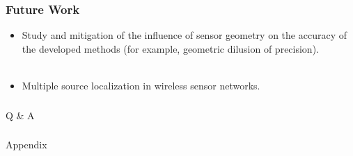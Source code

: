 \documentclass [t] {beamer} %
\begin{document}
\begin{frame} %
\frametitle{Future Work}
\phantom{m}
\phantom{m}
\phantom{m}
\begin{itemize}
\item
Study and mitigation of the influence of sensor geometry on the accuracy of the developed methods (for example, geometric dilusion of precision).
\\~\\
\item
Multiple source localization in wireless sensor networks.
\end{itemize}
\end{frame}


\begin{frame} [noframenumbering]
\frametitle{  }
\phantom{m} 
\phantom{m}
\phantom{m} 
\phantom{m}
\phantom{m} 
\phantom{m}
\Huge{\centerline{Q \& A }}

\end{frame}

%
\appendix
\begin{frame} [noframenumbering]
\frametitle{  }
\phantom{m} 
\phantom{m}
\phantom{m} 
\phantom{m}
\phantom{m} 
\phantom{m}
\Huge{\centerline{Appendix}}
\end{frame}





%
%

\end{document}
